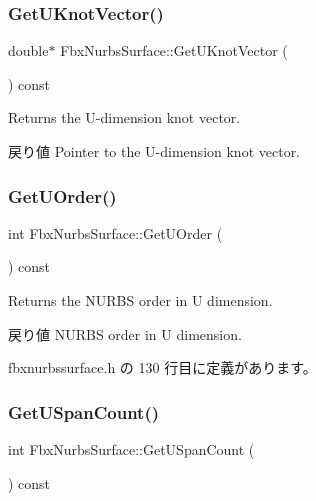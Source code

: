 \subsubsection{\texorpdfstring{Get\+U\+Knot\+Vector()}{GetUKnotVector()}}
{\footnotesize\ttfamily double$\ast$ Fbx\+Nurbs\+Surface\+::\+Get\+U\+Knot\+Vector (\begin{DoxyParamCaption}{ }\end{DoxyParamCaption}) const}

Returns the U-\/dimension knot vector. \begin{DoxyReturn}{戻り値}
Pointer to the U-\/dimension knot vector. 
\end{DoxyReturn}
\mbox{\label{class_fbx_nurbs_surface_ac085e8d245849e5864bf8fd192eeb62e}} 
\subsubsection{\texorpdfstring{Get\+U\+Order()}{GetUOrder()}}
{\footnotesize\ttfamily int Fbx\+Nurbs\+Surface\+::\+Get\+U\+Order (\begin{DoxyParamCaption}{ }\end{DoxyParamCaption}) const\hspace{0.3cm}{\ttfamily [inline]}}

Returns the N\+U\+R\+BS order in U dimension. \begin{DoxyReturn}{戻り値}
N\+U\+R\+BS order in U dimension. 
\end{DoxyReturn}


 fbxnurbssurface.\+h の 130 行目に定義があります。

\mbox{\label{class_fbx_nurbs_surface_af42bb32cacf0ceb7616db1a28e5b27e1}} 
\subsubsection{\texorpdfstring{Get\+U\+Span\+Count()}{GetUSpanCount()}}
{\footnotesize\ttfamily int Fbx\+Nurbs\+Surface\+::\+Get\+U\+Span\+Count (\begin{DoxyParamCaption}{ }\end{DoxyParamCaption}) const}

